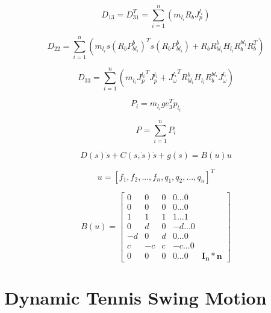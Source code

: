 \documentclass{jarticle}
\begin{document}
\begin{equation}
  D_{13} = D_{31}^T = \sum_{i=1}^{n}(m_{l_i} R_b J_p^{l_i})
\end{equation}

\begin{equation}
  D_{22} = \sum_{i=1}^{n}(m_{l_i} s(R_b P_{bl_i}^b)^T s(R_b P_{bl_i}^b)
  + R_b R_{bl_i}^b H_{l_i} R_b^{bl_i} R_b^T)
\end{equation}

\begin{equation}
  D_{33} = \sum_{i=1}^{n}(m_{l_i} {J_p^{l_i}}^T J_p^{l_i}
  + {J_\omega^{l_i}}^T R_{bl_i}^b H_{l_i} R_b^{bl_i} J_\omega^{l_i})
\end{equation}

\begin{equation}
  P_i = m_{l_i} g e_3^T p_{l_i}
\end{equation}

\begin{equation}
  P = \sum_{i=1}^{n}{P_i}
\end{equation}

\begin{equation}
  D(s) \ddot{s} + C(s, \dot{s}) \dot{s} + g(s) = B(u) u
\end{equation}

\begin{equation}
  u = [f_1, f_2, ..., f_n, q_1, q_2, ..., q_n]^T
\end{equation}

\begin{equation}
  B(u) = \begin{bmatrix}
    0 & 0 & 0 & 0 ... 0 \\
    0 & 0 & 0 & 0 ... 0 \\
    1 & 1 & 1 & 1 ... 1 \\
    0 & d & 0 & -d ... 0 \\
    -d & 0 & d & 0 ... 0 \\
    c & -c & c & -c ... 0 \\
    0 & 0 & 0 & 0 ... 0 & \bm{I_n*n}
  \end{bmatrix}
\end{equation}



\section{Dynamic Tennis Swing Motion}
\end{document}
